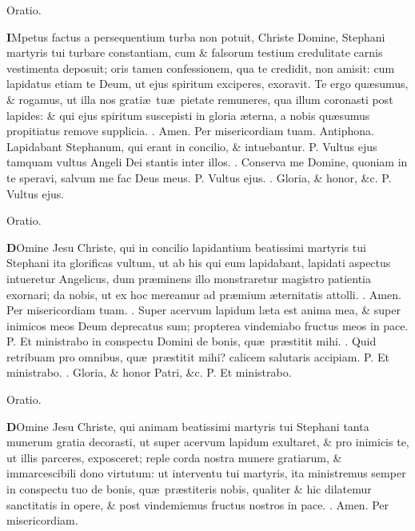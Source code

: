 \documentclass[letter,11pt]{book}
\makeatletter
\DeclareRobustCommand{\Vbar}{\vers@resp{-0.1em}{V}}
\DeclareRobustCommand{\Rbar}{\vers@resp{0pt}{R}}
\newcommand{\vers@resp@sym}{\raisebox{0.2ex}{\rotatebox[origin=c]{-20}{$\m@th\rceil$}}}
\newcommand{\vers@resp}[2]{%
  {\ooalign{\hidewidth\kern#1\vers@resp@sym\hidewidth\cr#2\cr}}%
}%
\def\P{\color{Red} P. \color{black}}
\def\V{\color{Red} \Vbar . \color{black}}
\def\R{\color{Red} \Rbar . \color{black}}
\makeatother
\begin{document}
\begin{multicols*}{2}
\vspace{-.5em} \begin{center} \color{Red} Oratio. \color{black} \end{center} \vspace{-.5em}
\lettrine[lines=2]{\bfseries \color{Red} I}{}Mpetus factus a persequentium turba non potuit, Christe Domine, Stephani martyris tui turbare constantiam, cum \& falsorum
testium credulitate carnis vestimenta deposuit; oris tamen confessionem, qua te credidit, non amisit: cum lapidatus etiam te Deum, ut ejus spiritum exciperes, exoravit. Te ergo qu\ae sumus, \& rogamus, ut illa nos grati\ae \ tu\ae \ pietate remuneres, qua illum coronasti post lapides: \& qui ejus spiritum suscepisti in gloria \ae terna, a nobis qu\ae sumus propitiatus remove supplicia. \R Amen. Per misericordiam tuam.
\newline \color{Red} Antiphona. \color{black} Lapidabant Stephanum, qui erant in concilio, \& intuebantur. \P Vultus ejus tamquam vultus Angeli Dei stantis inter illos. \V Conserva me Domine, quoniam in te speravi, salvum me fac Deus meus. \P Vultus ejus. \V Gloria, \& honor, \&c. \P Vultus ejus.
\vspace{-.5em} \begin{center} \color{Red} Oratio. \color{black} \end{center} \vspace{-.5em}
\lettrine[lines=2]{\bfseries \color{Red} D}{}Omine Jesu Christe, qui in concilio lapidantium beatissimi martyris tui Stephani ita glorificas vultum, ut ab his qui eum lapidabant, lapidati aspectus intueretur Angelicus, dum pr\ae minens illo monstraretur magistro patientia exornari; da nobis, ut ex hoc mereamur ad pr\ae mium \ae ternitatis attolli. \R Amen. Per misericordiam tuam.
\newline \R Super acervum lapidum l\ae ta est anima mea, \& super inimicos meos Deum deprecatus sum; propterea vindemiabo fructus meos in pace. \P Et ministrabo in conspectu Domini de bonis, qu\ae \ pr\ae stitit mihi. \V Quid retribuam pro omnibus, qu\ae \ pr\ae stitit mihi? calicem salutaris accipiam. \P Et ministrabo. \V Gloria, \& honor Patri, \&c. \P Et ministrabo.
\vspace{-.5em} \begin{center} \color{Red} Oratio. \color{black} \end{center} \vspace{-.5em}
\lettrine[lines=2]{\bfseries \color{Red} D}{}Omine Jesu Christe, qui animam beatissimi martyris tui Stephani tanta munerum gratia decorasti, ut super acervum lapidum exultaret, \& pro inimicis te, ut illis parceres, exposceret; reple corda nostra munere gratiarum, \& immarcescibili dono virtutum: ut interventu tui martyris, ita ministremus semper in conspectu tuo de bonis, qu\ae \ pr\ae stiteris nobis, qualiter \& hic dilatemur sanctitatis in opere, \& post vindemiemus fructus nostros in pace. \R Amen. Per misericordiam.

\end{multicols*}
\end{document}
